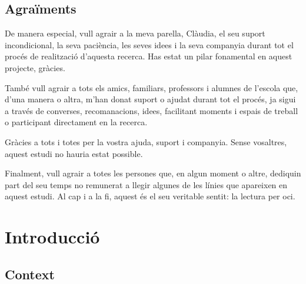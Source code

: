 \documentclass[12pt]{article}
\newif\ifstartwithtitle
\newcommand{\subsectiononumber}[1]{%
  \subsection*{#1}
  \phantomsection
}
\begin{document}
\newpage
\subsectiononumber{Agraïments}
De manera especial, vull agrair a la meva parella, Clàudia, el seu suport incondicional, la seva paciència, les seves idees i la seva companyia durant tot el procés de realització d'aquesta recerca. Has estat un pilar fonamental en aquest projecte, gràcies.

També vull agrair a tots els amics, familiars, professors i alumnes de l'escola que, d'una manera o altra, m'han donat suport o ajudat durant tot el procés, ja sigui a través de converses, recomanacions, idees, facilitant moments i espais de treball o participant directament en la recerca.

Gràcies a tots i totes per la vostra ajuda, suport i companyia. Sense vosaltres, aquest estudi no hauria estat possible.

Finalment, vull agrair a totes les persones que, en algun moment o altre, dediquin part del seu temps no remunerat a llegir algunes de les línies que apareixen en aquest estudi. Al cap i a la fi, aquest és el seu veritable sentit: la lectura per oci.

\newpage
\tableofcontents
\newpage
\listoffigures
\newpage
\listoftables
\newpage


\newpage
\section{Introducció}
\label{intro}

\subsection{Context}
\end{document}
